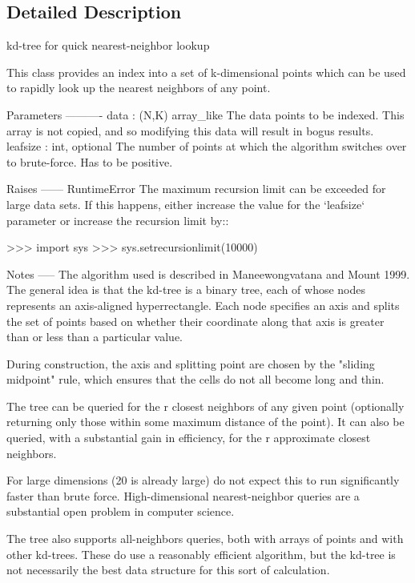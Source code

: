\subsection{Detailed Description}
\begin{DoxyVerb}kd-tree for quick nearest-neighbor lookup

This class provides an index into a set of k-dimensional points which
can be used to rapidly look up the nearest neighbors of any point.

Parameters
----------
data : (N,K) array_like
    The data points to be indexed. This array is not copied, and
    so modifying this data will result in bogus results.
leafsize : int, optional
    The number of points at which the algorithm switches over to
    brute-force.  Has to be positive.

Raises
------
RuntimeError
    The maximum recursion limit can be exceeded for large data
    sets.  If this happens, either increase the value for the `leafsize`
    parameter or increase the recursion limit by::

        >>> import sys
        >>> sys.setrecursionlimit(10000)

Notes
-----
The algorithm used is described in Maneewongvatana and Mount 1999.
The general idea is that the kd-tree is a binary tree, each of whose
nodes represents an axis-aligned hyperrectangle. Each node specifies
an axis and splits the set of points based on whether their coordinate
along that axis is greater than or less than a particular value.

During construction, the axis and splitting point are chosen by the
"sliding midpoint" rule, which ensures that the cells do not all
become long and thin.

The tree can be queried for the r closest neighbors of any given point
(optionally returning only those within some maximum distance of the
point). It can also be queried, with a substantial gain in efficiency,
for the r approximate closest neighbors.

For large dimensions (20 is already large) do not expect this to run
significantly faster than brute force. High-dimensional nearest-neighbor
queries are a substantial open problem in computer science.

The tree also supports all-neighbors queries, both with arrays of points
and with other kd-trees. These do use a reasonably efficient algorithm,
but the kd-tree is not necessarily the best data structure for this
sort of calculation.\end{DoxyVerb}
 

